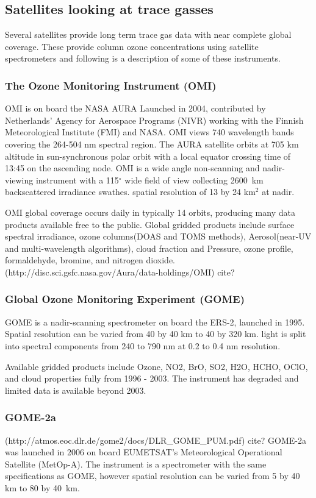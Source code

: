 \subsection{Satellites looking at trace gasses}
Several satellites provide long term trace gas data with near complete global coverage. These provide column ozone concentrations using satellite spectrometers and following is a description of some of these instruments.

\subsubsection{The Ozone Monitoring Instrument (OMI)}
OMI is on board the NASA AURA Launched in 2004, contributed by Netherlands' Agency for Aerospace Programs (NIVR) working with the Finnish Meteorological Institute (FMI) and NASA. OMI views 740 wavelength bands covering the 264-504 nm spectral region.
The AURA satellite orbits at 705 km altitude in sun-synchronous polar orbit with a local equator crossing time of 13:45 on the ascending node.
OMI is a wide angle non-scanning and nadir-viewing instrument with a 115$^{\circ}$ wide field of view collecting 2600~km backscattered irradiance swathes. spatial resolution of 13 by 24 km$^2$ at nadir. 

OMI global coverage occurs daily in typically 14 orbits, producing many data products available free to the public.
Global gridded products include surface spectral irradiance, ozone columns(DOAS and TOMS methods), Aerosol(near-UV and multi-wavelength algorithms), cloud fraction and Pressure, ozone profile, formaldehyde, bromine, and nitrogen dioxide.
(http://disc.sci.gsfc.nasa.gov/Aura/data-holdings/OMI) cite?

\subsubsection{Global Ozone Monitoring Experiment (GOME)}

GOME is a nadir-scanning spectrometer on board the ERS-2, launched in 1995.
Spatial resolution can be varied from 40 by 40 km to 40 by 320 km.
light is split into spectral components from 240 to 790 nm at 0.2 to 0.4 nm resolution.

Available gridded products include Ozone, NO2, BrO, SO2, H2O, HCHO, OClO, and cloud properties fully from 1996 - 2003. The instrument has degraded and limited data is available beyond 2003. 

\subsubsection{GOME-2a}
(http://atmos.eoc.dlr.de/gome2/docs/DLR_GOME_PUM.pdf) cite?
GOME-2a was launched in 2006 on board EUMETSAT's Meteorological Operational Satellite (MetOp-A). 
The instrument is a spectrometer with the same specifications as GOME, however spatial resolution can be varied from 5 by 40 km to 80 by 40~km.

